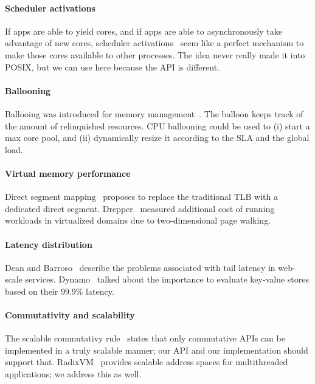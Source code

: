 \paragraph*{Scheduler activations} 
If apps are able to yield cores, and if apps are able to
asynchronously take advantage of new cores, scheduler
activations~\cite{DBLP:journals/tocs/AndersonBLL92} seem like a
perfect mechanism to make those cores available to other processes. 
The idea never really made it into POSIX, but we can use here because the API is different. 

\paragraph*{Ballooning}
Ballooing was introduced for memory
management~\cite{DBLP:conf/osdi/Waldspurger02}.  The balloon keeps
track of the amount of relinquished resources.  CPU ballooning could
be used to (i) start a max core pool, and (ii) dynamically resize it
according to the SLA and the global load.

\paragraph*{Virtual memory performance}  
Direct segment mapping~\cite{DBLP:conf/isca/BasuGCHS13} proposes to
replace the traditional TLB with a dedicated direct segment.
Drepper~\cite{DBLP:journals/queue/Drepper08} measured additional cost
of running workloads in virtualized domains due to two-dimensional
page walking.

\paragraph*{Latency distribution}  
Dean and Barroso~\cite{DBLP:journals/cacm/DeanB13} describe the
problems associated with tail latency in web-scale services.
Dynamo~\cite{DBLP:conf/sosp/DeCandiaHJKLPSVV07} talked about the
importance to evaluate key-value stores based on their 99.9\% latency.


\paragraph*{Commutativity and scalability} 
The scalable commutativy rule~\cite{DBLP:conf/sosp/ClementsKZMK13}
states that only commutative APIs can be implemented in a truly
scalable manner; our API and our implementation should support that.
RadixVM~\cite{DBLP:conf/eurosys/ClementsKZ13} provides scalable
address spaces for multithreaded applications; we address this as well.

